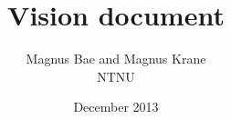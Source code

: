 \documentclass[english,10pt, oneside, a4paper]{article}
\begin{document}
\clearpage
\title{Vision document}
\author{Magnus Bae and Magnus Krane\\ NTNU}
\date{December 2013}

\setcounter{tocdepth}{5}
\setcounter{secnumdepth}{5}

\makeatletter
\renewcommand{\l@section}{\@dottedtocline{1}{1.5em}{2.6em}}
\renewcommand{\l@subsection}{\@dottedtocline{2}{4.0em}{3.6em}}
\renewcommand{\l@subsubsection}{\@dottedtocline{3}{7.4em}{4.5em}}
\makeatother
\renewcommand{\thesection}{C.\arabic{section}}%

\setcounter{page}{43}
\clearpage
\renewcommand\contentsname{Table of Contents}
\tableofcontents







\end{document}
